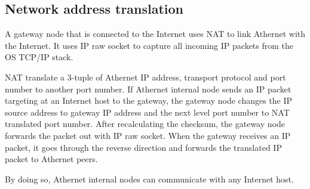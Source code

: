 \subsection{Network address translation}
A gateway node that is connected to the Internet uses NAT to link Athernet with the Internet.
It uses IP raw socket to capture all incoming IP packets from the OS TCP/IP stack.\par
NAT translate a 3-tuple of Athernet IP address, transport protocol and port number to another port number.
If Athernet internal node sends an IP packet targeting at an Internet host to the gateway,
the gateway node changes the IP source address to gateway IP address and the next level port number to NAT translated port number.
After recalculating the checksum, the gateway node forwards the packet out with IP raw socket.
When the gateway receives an IP packet, it goes through the reverse direction and forwards the translated IP packet to Athernet peers.\par
By doing so, Athernet internal nodes can communicate with any Internet host.
